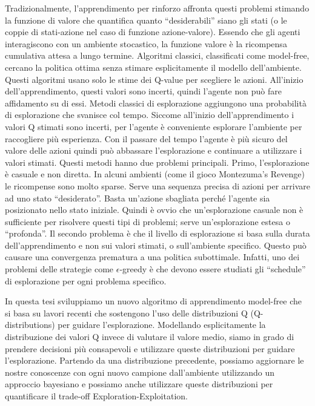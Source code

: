 Tradizionalmente, l'apprendimento per rinforzo affronta questi problemi stimando la funzione di valore che quantifica quanto ``desiderabili'' siano gli stati (o le coppie di stati-azione nel caso di funzione azione-valore). Essendo che gli agenti interagiscono con un ambiente stocastico, la funzione valore è la ricompensa cumulativa attesa a lungo termine. Algoritmi classici, classificati come model-free, cercano la politica ottima senza stimare esplicitamente il modello dell'ambiente. Questi algoritmi usano solo le stime dei Q-value per scegliere  le azioni. All'inizio dell'apprendimento, questi valori sono incerti, quindi l'agente non può fare affidamento su di essi. Metodi classici di esplorazione aggiungono una probabilità di esplorazione che svanisce col tempo. Siccome all'inizio dell'apprendimento i valori Q stimati sono incerti, per l'agente è conveniente esplorare l'ambiente per raccogliere più esperienza. Con il passare del tempo l'agente è più sicuro del valore delle azioni quindi può abbassare l'esplorazione e continuare  a utilizzare i valori stimati. Questi metodi hanno due problemi principali. Primo, l'esplorazione è casuale e non diretta. In alcuni ambienti (come il gioco Montezuma's Revenge) le ricompense sono molto sparse. Serve una sequenza precisa di azioni per arrivare ad uno stato ``desiderato''. Basta un'azione sbagliata perché l'agente sia posizionato nello stato iniziale. Quindi è ovvio che un'esplorazione casuale non è sufficiente per risolvere questi tipi di problemi; serve un'esplorazione estesa o ``profonda''. Il secondo problema è che il livello di esplorazione si basa sulla durata dell'apprendimento e non sui valori stimati, o sull'ambiente specifico. Questo può causare una convergenza prematura a una politica subottimale. Infatti, uno dei problemi delle strategie come $\epsilon$-greedy è che devono essere studiati gli ``schedule'' di esplorazione per ogni problema specifico.\par
In questa tesi sviluppiamo un nuovo algoritmo di apprendimento model-free che si basa su lavori recenti che sostengono l'uso delle distribuzioni Q (Q-distributions) per guidare l'esplorazione. Modellando esplicitamente la distribuzione dei valori Q invece di valutare il valore medio, siamo in grado di prendere decisioni più consapevoli e utilizzare queste distribuzioni per guidare l'esplorazione. Partendo da una distribuzione precedente, possiamo aggiornare le nostre conoscenze con ogni nuovo campione dall'ambiente utilizzando un approccio bayesiano e possiamo anche utilizzare queste distribuzioni per quantificare il trade-off Exploration-Exploitation.\par
